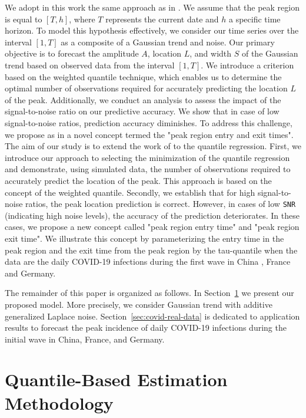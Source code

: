 \documentclass[12pt,a4paper]{article}
\begin{document}
	We adopt in this work the same approach as in \cite{Der25} 
	. We assume that the peak region is equal to $[T,h]$, where $T$ represents the current date and $h$ a specific time horizon. To model this hypothesis effectively, we consider our time series over the interval $[1,T]$ as a composite of a Gaussian trend and noise.
	Our primary objective is to forecast the amplitude $A$, location $L$, and width $S$ of the Gaussian trend based on observed data from the interval $[1,T]$. We introduce a criterion based on the weighted quantile technique, which enables us to determine the optimal number of observations required for accurately predicting the location $L$ of the peak. Additionally, we conduct an analysis to assess the impact of the signal-to-noise ratio on our predictive accuracy. We show that in case of low signal-to-noise ratios, prediction accuracy diminishes. To address this challenge, we propose 
	as in \cite{Der25}
	a novel concept termed the "peak region entry and exit times".\\
	
	The aim of our study is to extend the work of \cite{Der25} 
	to the quantile regression. First, we introduce our approach to selecting the 
	minimization of the quantile regression and demonstrate, using simulated data, the number of observations required to accurately predict the location of the peak. This approach is based on the concept of the weighted quantile. Secondly, we establish that for high signal-to-noise ratios, the peak location prediction is correct. However, in cases of low \texttt{SNR} (indicating high noise levels), the accuracy of the prediction deteriorates. In these cases, we propose a new concept called "peak region entry time" and "peak region exit time". We illustrate this concept by
	parameterizing the entry time in the peak region and the exit time from the peak region by 
	the tau-quantile when the data are 
	the daily COVID-19 infections during the first wave in China \cite{Bar20}, France and Germany.
	
	The remainder of this paper is organized as follows. In Section~\ref{section:quantile_amplitude} we present our proposed model. More
	precisely, we consider Gaussian trend with additive generalized Laplace noise. 
	Section~\ref{sec:covid-real-data} is dedicated to application results to forecast the peak incidence of daily COVID-19 infections during the initial wave in China, France, and Germany.
	
	\section{Quantile-Based Estimation Methodology}
	\label{section:quantile_amplitude}
	
\end{document}
